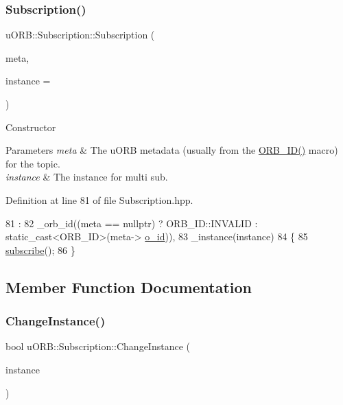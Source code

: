 \subsubsection{\texorpdfstring{Subscription()}{Subscription()}\hspace{0.1cm}{\footnotesize\ttfamily [2/2]}}
{\footnotesize\ttfamily u\+O\+R\+B\+::\+Subscription\+::\+Subscription (\begin{DoxyParamCaption}\item[{const \hyperlink{structorb__metadata}{orb\+\_\+metadata} $\ast$}]{meta,  }\item[{uint8\+\_\+t}]{instance = {} }\end{DoxyParamCaption})\hspace{0.3cm}{\ttfamily [inline]}}

Constructor


\begin{DoxyParams}{Parameters}
{\em meta} & The u\+O\+RB metadata (usually from the \hyperlink{uORB_8h_a96af5434ec1acdf24287bd7851b0413f}{O\+R\+B\+\_\+\+I\+D()} macro) for the topic. \\
\hline
{\em instance} & The instance for multi sub. \\
\hline
\end{DoxyParams}


Definition at line 81 of file Subscription.\+hpp.


\begin{DoxyCode}
81                                                                  :
82         \_orb\_id((meta == \textcolor{keyword}{nullptr}) ? ORB\_ID::INVALID : static\_cast<ORB\_ID>(meta->
      \hyperlink{structorb__metadata_a9f5cae5c486a015774b7accc62ca040e}{o\_id})),
83         \_instance(instance)
84     \{
85         \hyperlink{classuORB_1_1Subscription_acb0fbd4b56d5e3c8edca15206e110223}{subscribe}();
86     \}
\end{DoxyCode}


\subsection{Member Function Documentation}
\mbox{\label{classuORB_1_1Subscription_a47a32a02ea909df267542d4b4ef99115}} 
\subsubsection{\texorpdfstring{Change\+Instance()}{ChangeInstance()}}
{\footnotesize\ttfamily bool u\+O\+R\+B\+::\+Subscription\+::\+Change\+Instance (\begin{DoxyParamCaption}\item[{uint8\+\_\+t}]{instance }\end{DoxyParamCaption})}

